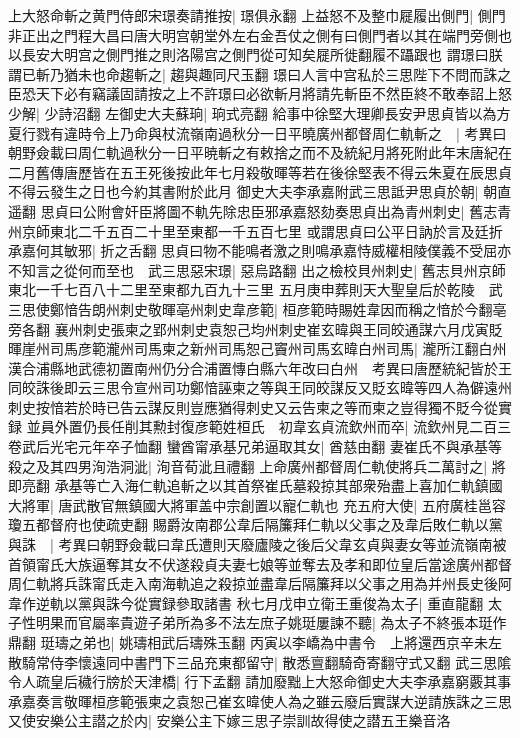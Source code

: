 上大怒命斬之黄門侍郎宋璟奏請推按|{
	璟俱永翻}
上益怒不及整巾屣履出側門|{
	側門非正出之門程大昌曰唐大明宫朝堂外左右金吾仗之側有曰側門者以其在端門旁側也以長安大明宫之側門推之則洛陽宫之側門從可知矣屣所徙翻履不躡跟也}
謂璟曰朕謂已斬乃猶未也命趨斬之|{
	趨與趣同尺玉翻}
璟曰人言中宫私於三思陛下不問而誅之臣恐天下必有竊議固請按之上不許璟曰必欲斬月將請先斬臣不然臣終不敢奉詔上怒少解|{
	少詩沼翻}
左御史大夫蘇珦|{
	珦式亮翻}
給事中徐堅大理卿長安尹思貞皆以為方夏行戮有違時令上乃命與杖流嶺南過秋分一日平曉廣州都督周仁軌斬之　|{
	考異曰朝野僉載曰周仁軌過秋分一日平暁斬之有敕捨之而不及統紀月將死附此年末唐紀在二月舊傳唐歷皆在五王死後按此年七月殺敬暉等若在後徐堅表不得云朱夏在辰思貞不得云發生之日也今約其書附於此月}
御史大夫李承嘉附武三思詆尹思貞於朝|{
	朝直遥翻}
思貞曰公附會奸臣將圖不軌先除忠臣邪承嘉怒劾奏思貞出為青州刺史|{
	舊志青州京師東北二千五百二十里至東都一千五百七里}
或謂思貞曰公平日訥於言及廷折承嘉何其敏邪|{
	折之舌翻}
思貞曰物不能鳴者激之則鳴承嘉恃威權相陵僕義不受屈亦不知言之從何而至也　武三思惡宋璟|{
	惡烏路翻}
出之檢校貝州刺史|{
	舊志貝州京師東北一千七百八十二里至東都九百九十三里}
五月庚申葬則天大聖皇后於乾陵　武三思使鄭愔告朗州刺史敬暉亳州刺史韋彦範|{
	桓彦範時賜姓韋因而稱之愔於今翻亳旁各翻}
襄州刺史張柬之郢州刺史袁恕己均州刺史崔玄暐與王同皎通謀六月戊寅貶暉崖州司馬彦範瀧州司馬柬之新州司馬恕己竇州司馬玄暐白州司馬|{
	瀧所江翻白州漢合浦縣地武德初置南州仍分合浦置慱白縣六年改曰白州　考異曰唐歷統紀皆於王同皎誅後即云三思令宣州司功鄭愔誣柬之等與王同皎謀反又貶玄暐等四人為僻遠州刺史按愔若於時已告云謀反則豈應猶得刺史又云告柬之等而柬之豈得獨不貶今從實録}
並員外置仍長任削其勲封復彦範姓桓氏　初韋玄貞流欽州而卒|{
	流欽州見二百三卷武后光宅元年卒子恤翻}
蠻酋甯承基兄弟逼取其女|{
	酋慈由翻}
妻崔氏不與承基等殺之及其四男洵浩洞泚|{
	洵音荀泚且禮翻}
上命廣州都督周仁軌使將兵二萬討之|{
	將即亮翻}
承基等亡入海仁軌追斬之以其首祭崔氏墓殺掠其部衆殆盡上喜加仁軌鎮國大將軍|{
	唐武散官無鎮國大將軍盖中宗創置以寵仁軌也}
充五府大使|{
	五府廣桂邕容瓊五都督府也使疏吏翻}
賜爵汝南郡公韋后隔簾拜仁軌以父事之及韋后敗仁軌以黨與誅　|{
	考異曰朝野僉載曰韋氏遭則天廢廬陵之後后父韋玄貞與妻女等並流嶺南被首領甯氏大族逼奪其女不伏遂殺貞夫妻七娘等並奪去及孝和即位皇后當途廣州都督周仁軌將兵誅甯氏走入南海軌追之殺掠並盡韋后隔簾拜以父事之用為并州長史後阿韋作逆軌以黨與誅今從實録參取諸書}
秋七月戊申立衛王重俊為太子|{
	重直龍翻}
太子性明果而官屬率貴遊子弟所為多不法左庶子姚珽屢諫不聽|{
	為太子不終張本珽作鼎翻}
珽璹之弟也|{
	姚璹相武后璹殊玉翻}
丙寅以李嶠為中書令　上將還西京辛未左散騎常侍李懷遠同中書門下三品充東都留守|{
	散悉亶翻騎奇寄翻守式又翻}
武三思隂令人疏皇后穢行牓於天津橋|{
	行下孟翻}
請加廢黜上大怒命御史大夫李承嘉窮覈其事承嘉奏言敬暉桓彦範張柬之袁恕己崔玄暐使人為之雖云廢后實謀大逆請族誅之三思又使安樂公主譛之於内|{
	安樂公主下嫁三思子崇訓故得使之譛五王樂音洛}
